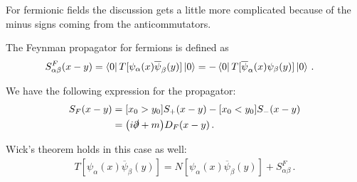 \documentclass[main.tex]{subfiles}
\begin{document}
For fermionic fields the discussion gets a little more complicated because of the minus signs coming from the anticommutators. 

\begin{definition}
The Feynman propagator for fermions is defined as 
%
\begin{align}
S^{F}_{\alpha \beta } (x-y)
&= \bra{0}T[\psi_{\alpha }(x) \overline{\psi}_{\beta }(y)] \ket{0}
= - \bra{0} T[\overline{\psi}_\alpha (x) \psi_{\beta }(y)] \ket{0}
\,.
\end{align}
\end{definition}

\begin{claim}
We have the following expression for the propagator: 
%
\begin{subequations}
\begin{align}
S_F(x-y) &= [x_0 > y_0 ] S_+ (x-y) - [x_0 < y_0 ] S_- (x-y)  \\
&= \qty(i \slashed{\partial} + m) D_F (x-y)
\,.
\end{align}
\end{subequations}
\end{claim}


\begin{claim}
Wick's theorem holds in this case as well: 
%
\begin{align}
T[\psi_{\alpha }(x) \overline{\psi}_{\beta }(y)]
= N [\psi_{\alpha }(x) \overline{\psi}_{\beta }(y)]
+ S^{F}_{\alpha \beta }
\,.
\end{align}
\end{claim}
\end{document}
